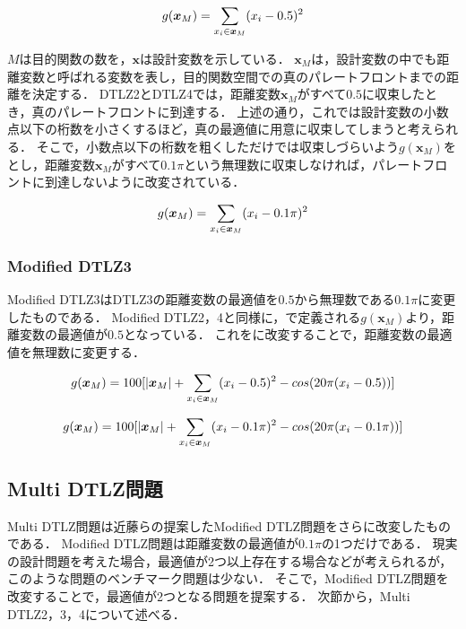 \documentclass[../main/main]{subfiles}
\begin{document}
\begin{equation}
\centering
g(\bm x_M) = \sum_{x_i \in \bm x_M} (x_i - 0.5)^2
\label{gx_dtlz2}
\end{equation}

$M$は目的関数の数を，$\bm x$は設計変数を示している．
$\bm x_M$は，設計変数の中でも距離変数と呼ばれる変数を表し，目的関数空間での真のパレートフロントまでの距離を決定する．
DTLZ2とDTLZ4では，距離変数$\bm x_M$がすべて$0.5$に収束したとき，真のパレートフロントに到達する．
上述の通り，これでは設計変数の小数点以下の桁数を小さくするほど，真の最適値に用意に収束してしまうと考えられる．
そこで，小数点以下の桁数を粗くしただけでは収束しづらいよう$g(\bm x_M)$をとし，距離変数$\bm x_M$がすべて$0.1\pi$という無理数に収束しなければ，パレートフロントに到達しないように改変されている．

\begin{equation}
\centering
g(\bm x_M) = \sum_{x_i \in \bm x_M} (x_i - 0.1 \pi)^2
\label{gx_mod2}
\end{equation}

\subsubsection{Modified DTLZ3}
Modified DTLZ3はDTLZ3の距離変数の最適値を$0.5$から無理数である$0.1 \pi$に変更したものである．
Modified DTLZ2，4と同様に，で定義される$g(\bm x_M)$より，距離変数の最適値が$0.5$となっている．
これをに改変することで，距離変数の最適値を無理数に変更する．

\begin{equation}
\centering
g(\bm x_M) = 100[|\bm x_M| + \sum_{x_i \in \bm x_M} (x_i - 0.5)^2 - cos(20 \pi (x_i - 0.5 ))]
\label{gx_dtlz3}
\end{equation}

\begin{equation}
\centering
g(\bm x_M) = 100[|\bm x_M| + \sum_{x_i \in \bm x_M} (x_i - 0.1\pi)^2 - cos(20 \pi (x_i - 0.1 \pi ))]
\label{gx_mod3}
\end{equation}

\newpage


\subsection{Multi DTLZ問題}
Multi DTLZ問題は近藤らの提案したModified DTLZ問題をさらに改変したものである．
Modified DTLZ問題は距離変数の最適値が$0.1\pi$の1つだけである．
現実の設計問題を考えた場合，最適値が2つ以上存在する場合などが考えられるが，このような問題のベンチマーク問題は少ない．
そこで，Modified DTLZ問題を改変することで，最適値が2つとなる問題を提案する．
次節から，Multi DTLZ2，3，4について述べる．
\end{document}
